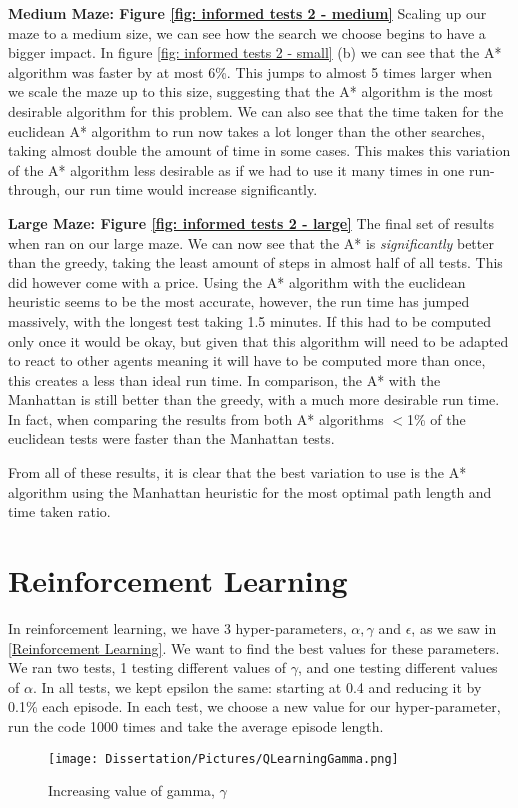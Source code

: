 \documentclass[]{final_report}
\begin{document}
\textbf{Medium Maze: Figure \ref{fig: informed tests 2 - medium}}
Scaling up our maze to a medium size, we can see how the search we choose begins to have a bigger impact. In figure \ref{fig: informed tests 2 - small} (b) we can see that the A* algorithm was faster by at most 6\%. This jumps to almost 5 times larger when we scale the maze up to this size, suggesting that the A* algorithm is the most desirable algorithm for this problem. We can also see that the time taken for the euclidean A* algorithm to run now takes a lot longer than the other searches, taking almost double the amount of time in some cases. This makes this variation of the A* algorithm less desirable as if we had to use it many times in one run-through, our run time would increase significantly.  

\textbf{Large Maze: Figure \ref{fig: informed tests 2 - large}}
The final set of results when ran on our large maze. We can now see that the A* is \textit{significantly} better than the greedy, taking the least amount of steps in almost half of all tests. This did however come with a price. Using the A* algorithm with the euclidean heuristic seems to be the most accurate, however, the run time has jumped massively, with the longest test taking 1.5 minutes. If this had to be computed only once it would be okay, but given that this algorithm will need to be adapted to react to other agents meaning it will have to be computed more than once, this creates a less than ideal run time. In comparison, the A* with the Manhattan is still better than the greedy, with a much more desirable run time. In fact, when comparing the results from both A* algorithms $<$1\% of the euclidean tests were faster than the Manhattan tests. 

From all of these results, it is clear that the best variation to use is the A* algorithm using the Manhattan heuristic for the most optimal path length and time taken ratio.

\newpage
\section{Reinforcement Learning} \label{Reinforcement Learning Experiments}

In reinforcement learning, we have 3 hyper-parameters, $\alpha, \gamma$ and $\epsilon$, as we saw in \ref{Reinforcement Learning}. We want to find the best values for these parameters. We ran two tests, 1 testing different values of $\gamma$, and one testing different values of $\alpha$. In all tests, we kept epsilon the same: starting at 0.4 and reducing it by 0.1\% each episode. In each test, we choose a new value for our hyper-parameter, run the code 1000 times and take the average episode length. 
\hspace*{-1cm} 
\begin{figure}[!htp]
    \centering
    \texttt{[image: Dissertation/Pictures/QLearningGamma.png]}
    \caption{Increasing value of gamma, $\gamma$}
    \label{fig:gamma}
\end{figure}
\end{document}
